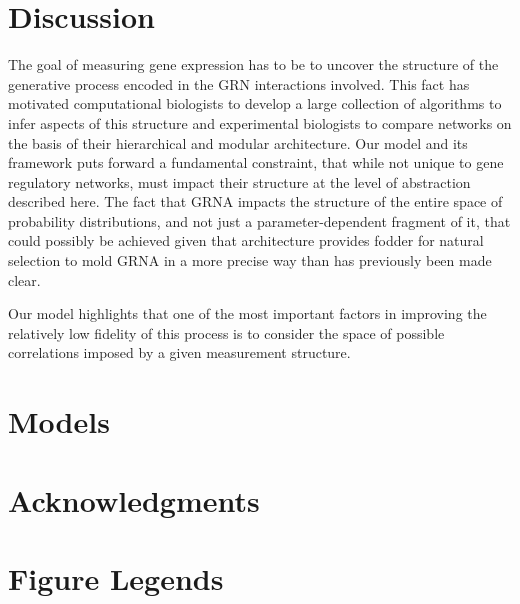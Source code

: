 \section*{Discussion}
The goal of measuring gene expression has to be to uncover the structure of the generative process encoded in the GRN interactions involved. This fact has motivated computational biologists to develop a large collection of algorithms to infer aspects of this structure \cite{DeSmet2010} and experimental biologists to compare networks \cite{Ideker2012} on the basis of their hierarchical and modular architecture. Our model and its framework puts forward a fundamental constraint, that while not unique to gene regulatory networks, must impact their structure at the level of abstraction described here. The fact that GRNA impacts the structure of the entire space of probability distributions, and not just a parameter-dependent fragment of it, that could possibly be achieved given that architecture provides fodder for natural selection to mold GRNA in a more precise way than has previously been made clear.

Our model highlights that one of the most important factors in improving the relatively low fidelity of this process is to consider the space of possible correlations imposed by a given measurement structure.


\section*{Models}


%

\section*{Acknowledgments}




\section*{Figure Legends}


